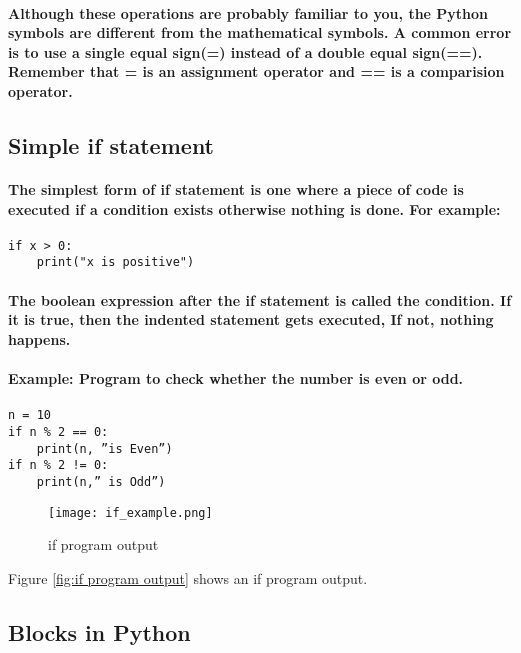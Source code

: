 \documentclass{book}
\begin{document}
\paragraph{Although these operations are probably familiar to you, the Python symbols are different from the
mathematical symbols. A common error is to use a single equal sign(=) instead of a double equal sign(==). Remember that = is an assignment operator and == is a comparision operator.}

\subsection *{Simple if statement}
\paragraph{The simplest form of if statement is one where a piece of code is executed if a condition exists
otherwise nothing is done. For example:}

\begin{verbatim}
if x > 0:
    print("x is positive")
\end{verbatim}

\paragraph{The boolean expression after the if statement is called the condition. If it is true, then the indented
statement gets executed, If not, nothing happens.}
\paragraph{\textbf{Example:} Program to check whether the number is even or odd.}

\begin{verbatim}
n = 10
if n % 2 == 0:
    print(n, ”is Even”)
if n % 2 != 0:
    print(n,” is Odd”)
\end{verbatim}

\begin{figure}
  \texttt{[image: if\_example.png]}
  \caption{if program output}
  \label{fig:if output}
\end{figure}

Figure \ref{fig:if program output} shows an if program output.


\subsection *{Blocks in Python}
\end{document}
